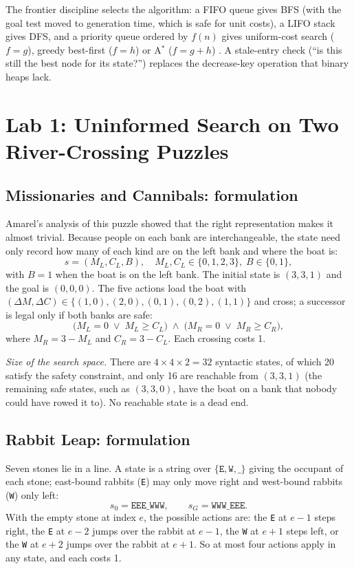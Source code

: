 \documentclass[journal]{IEEEtran}
\newcommand{\st}[1]{\texttt{#1}}
\begin{document}
The frontier discipline selects the algorithm: a FIFO queue gives BFS (with the goal test
moved to generation time, which is safe for unit costs), a LIFO stack gives DFS, and a
priority queue ordered by $f(n)$ gives uniform-cost search ($f=g$), greedy best-first
($f=h$) or A$^*$ ($f=g+h$) \cite{aima4}. A stale-entry check (``is this still the best node
for its state?'') replaces the decrease-key operation that binary heaps lack.

\section{Lab 1: Uninformed Search on Two River-Crossing Puzzles}
\subsection{Missionaries and Cannibals: formulation}
Amarel's analysis of this puzzle \cite{amarel1968} showed that the right representation makes
it almost trivial. Because people on each bank are interchangeable, the state need only
record how many of each kind are on the left bank and where the boat is:
\begin{equation}
s = (M_L, C_L, B), \quad M_L, C_L \in \{0,1,2,3\},\; B\in\{0,1\},
\end{equation}
with $B=1$ when the boat is on the left bank. The initial state is $(3,3,1)$ and the goal
is $(0,0,0)$. The five actions load the boat with $(\Delta M,\Delta C)\in\{(1,0),(2,0),(0,1),
(0,2),(1,1)\}$ and cross; a successor is legal only if both banks are safe:
\begin{equation}
\bigl(M_L = 0 \;\lor\; M_L \ge C_L\bigr) \;\land\; \bigl(M_R = 0 \;\lor\; M_R \ge C_R\bigr),
\end{equation}
where $M_R = 3-M_L$ and $C_R=3-C_L$. Each crossing costs 1.

\emph{Size of the search space.} There are $4\times4\times2=32$ syntactic states, of which
20 satisfy the safety constraint, and only 16 are reachable from $(3,3,1)$ (the remaining
safe states, such as $(3,3,0)$, have the boat on a bank that nobody could have rowed it
to). No reachable state is a dead end.

\subsection{Rabbit Leap: formulation}
Seven stones lie in a line. A state is a string over $\{\st{E},\st{W},\st{\_}\}$ giving the
occupant of each stone; east-bound rabbits (\st{E}) may only move right and west-bound
rabbits (\st{W}) only left:
\begin{equation}
s_0 = \st{EEE\_WWW}, \qquad s_G = \st{WWW\_EEE}.
\end{equation}
With the empty stone at index $e$, the possible actions are: the \st{E} at $e-1$ steps
right, the \st{E} at $e-2$ jumps over the rabbit at $e-1$, the \st{W} at $e+1$ steps left,
or the \st{W} at $e+2$ jumps over the rabbit at $e+1$. So at most four actions apply in any
state, and each costs 1.
\end{document}
